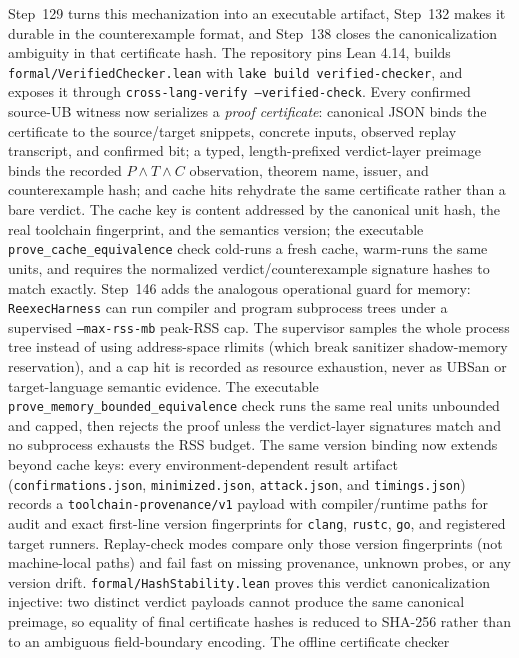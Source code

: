 \documentclass[10pt,a4paper]{article}
\begin{document}
Step~129 turns this mechanization into an executable artifact, Step~132
makes it durable in the counterexample format, and Step~138 closes the
canonicalization ambiguity in that certificate hash.  The repository pins Lean 4.14,
builds \texttt{formal/VerifiedChecker.lean} with
\texttt{lake build verified-checker}, and exposes it through
\texttt{cross-lang-verify --verified-check}. Every confirmed source-UB witness
now serializes a \emph{proof certificate}: canonical JSON binds the certificate
to the source/target snippets, concrete inputs, observed replay transcript, and
confirmed bit; a typed, length-prefixed verdict-layer preimage binds the recorded
\(P\wedge T\wedge C\) observation, theorem name, issuer, and counterexample hash;
and cache hits rehydrate the same certificate rather than a bare verdict.  The
cache key is content addressed by the canonical unit hash, the real toolchain
fingerprint, and the semantics version; the executable
\texttt{prove\_cache\_equivalence} check cold-runs a fresh cache, warm-runs the
same units, and requires the normalized verdict/counterexample signature hashes
to match exactly.
Step~146 adds the analogous operational guard for memory: \texttt{ReexecHarness}
can run compiler and program subprocess trees under a supervised
\texttt{--max-rss-mb} peak-RSS cap. The supervisor samples the whole process tree
instead of using address-space rlimits (which break sanitizer shadow-memory
reservation), and a cap hit is recorded as resource exhaustion, never as UBSan or
target-language semantic evidence. The executable
\texttt{prove\_memory\_bounded\_equivalence} check runs the same real units
unbounded and capped, then rejects the proof unless the verdict-layer signatures
match and no subprocess exhausts the RSS budget.
The same version binding now extends beyond cache keys: every
environment-dependent result artifact
(\texttt{confirmations.json}, \texttt{minimized.json}, \texttt{attack.json}, and
\texttt{timings.json}) records a \texttt{toolchain-provenance/v1} payload with
compiler/runtime paths for audit and exact first-line version fingerprints for
\texttt{clang}, \texttt{rustc}, \texttt{go}, and registered target runners.
Replay-check modes compare only those version fingerprints (not machine-local
paths) and fail fast on missing provenance, unknown probes, or any version drift.
\texttt{formal/HashStability.lean} proves this verdict canonicalization
injective: two distinct verdict payloads cannot produce the same canonical
preimage, so equality of final certificate hashes is reduced to SHA-256 rather
than to an ambiguous field-boundary encoding.  The offline certificate checker
\end{document}
